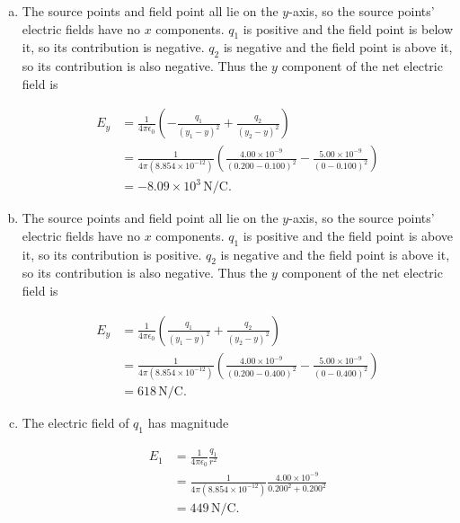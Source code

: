 \documentclass{article}
\begin{document}
\begin{enumerate}[a)]
  \item The source points and field point all lie on the $y$-axis, so the source points' electric fields have no $x$ components. $q_1$ is positive and the field point is below it, so its contribution is negative. $q_2$ is negative and the field point is above it, so its contribution is also negative. Thus the $y$ component of the net electric field is

        \begin{align*}
          E_y & = \frac{1}{4 \pi \epsilon_0} \left( -\frac{q_1}{(y_1 - y)^2} + \frac{q_2}{(y_2 - y)^2} \right)                                                     \\
              & = \frac{1}{4 \pi (8.854 \times 10^{-12})} \left( \frac{4.00 \times 10^{-9}}{(0.200 - 0.100)^2} - \frac{5.00 \times 10^{-9}}{(0 - 0.100)^2} \right) \\
              & = -8.09 \times 10^3 \,\textrm{N}/\textrm{C}.
        \end{align*}

  \item The source points and field point all lie on the $y$-axis, so the source points' electric fields have no $x$ components. $q_1$ is positive and the field point is above it, so its contribution is positive. $q_2$ is negative and the field point is above it, so its contribution is also negative. Thus the $y$ component of the net electric field is

        \begin{align*}
          E_y & = \frac{1}{4 \pi \epsilon_0} \left( \frac{q_1}{(y_1 - y)^2} + \frac{q_2}{(y_2 - y)^2} \right)                                                      \\
              & = \frac{1}{4 \pi (8.854 \times 10^{-12})} \left( \frac{4.00 \times 10^{-9}}{(0.200 - 0.400)^2} - \frac{5.00 \times 10^{-9}}{(0 - 0.400)^2} \right) \\
              & = 618 \,\textrm{N}/\textrm{C}.
        \end{align*}

  \item The electric field of $q_1$ has magnitude

        \begin{align*}
          E_1 & = \frac{1}{4 \pi \epsilon_0} \frac{q_1}{r^2}                                            \\
              & = \frac{1}{4 \pi (8.854 \times 10^{-12})} \frac{4.00 \times 10^{-9}}{0.200^2 + 0.200^2} \\
              & = 449 \,\textrm{N}/\textrm{C}.
        \end{align*}


\end{enumerate}
\end{document}
